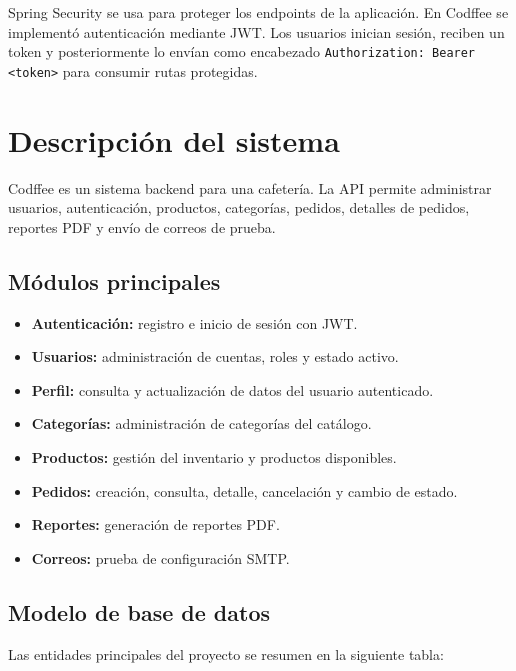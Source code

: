 \documentclass[10pt,a4paper]{article}
\newcommand{\cod}[1]{\texttt{\scriptsize #1}}
\begin{document}
Spring Security se usa para proteger los endpoints de la aplicación. En Codffee se implementó autenticación mediante JWT. Los usuarios inician sesión, reciben un token y posteriormente lo envían como encabezado \cod{Authorization: Bearer <token>} para consumir rutas protegidas.

\section{Descripción del sistema}

Codffee es un sistema backend para una cafetería. La API permite administrar usuarios, autenticación, productos, categorías, pedidos, detalles de pedidos, reportes PDF y envío de correos de prueba.

\subsection{Módulos principales}

\begin{itemize}
    \item \textbf{Autenticación:} registro e inicio de sesión con JWT.
    \item \textbf{Usuarios:} administración de cuentas, roles y estado activo.
    \item \textbf{Perfil:} consulta y actualización de datos del usuario autenticado.
    \item \textbf{Categorías:} administración de categorías del catálogo.
    \item \textbf{Productos:} gestión del inventario y productos disponibles.
    \item \textbf{Pedidos:} creación, consulta, detalle, cancelación y cambio de estado.
    \item \textbf{Reportes:} generación de reportes PDF.
    \item \textbf{Correos:} prueba de configuración SMTP.
\end{itemize}

\subsection{Modelo de base de datos}

Las entidades principales del proyecto se resumen en la siguiente tabla:
\end{document}
